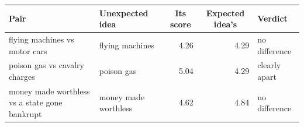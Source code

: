 \begin{tabular}{llrr l}
\toprule
Pair & Unexpected idea & \multicolumn{1}{c}{Its score} & \multicolumn{1}{c}{Expected idea's} & Verdict \\
\midrule
flying machines vs motor cars & flying machines & 4.26 & 4.29 & no difference \\
poison gas vs cavalry charges & poison gas & 5.04 & 4.29 & clearly apart \\
money made worthless vs a state gone bankrupt & money made worthless & 4.62 & 4.84 & no difference \\
\bottomrule
\end{tabular}